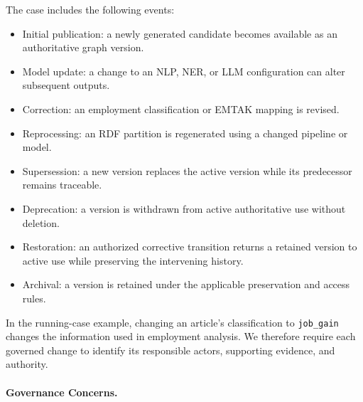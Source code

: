 \documentclass[journal]{IEEEtran}
\begin{document}
The case includes the following events:
\begin{itemize}
    \item Initial publication:
    a newly generated candidate becomes available as an
    authoritative graph version.

    \item Model update:
    a change to an NLP, NER, or LLM configuration can alter
    subsequent outputs.

    \item Correction:
    an employment classification or EMTAK mapping is revised.

    \item Reprocessing:
    an RDF partition is regenerated using a changed pipeline
    or model.

    \item Supersession:
    a new version replaces the active version while its
    predecessor remains traceable.

    \item Deprecation:
    a version is withdrawn from active authoritative use
    without deletion.

    \item Restoration:
    an authorized corrective transition returns a retained
    version to active use while preserving the intervening
    history.

    \item Archival:
    a version is retained under the applicable preservation
    and access rules.
\end{itemize}

In the running-case example, changing an article's classification
to \texttt{job\_gain} changes the information used in employment
analysis. We therefore require each governed change to identify
its responsible actors, supporting evidence, and authority.

\paragraph{Governance Concerns.}
\end{document}
